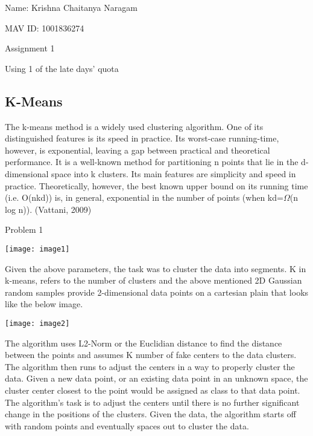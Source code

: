 \documentclass{article} %
\begin{document}


\noindent Name: Krishna Chaitanya Naragam

\noindent MAV ID: 1001836274

\noindent Assignment 1

\noindent Using 1 of the late days' quota

\noindent 
\subsection{K-Means}

\noindent The k-means method is a widely used clustering algorithm. One of its distinguished features is its speed in practice. Its worst-case running-time, however, is exponential, leaving a gap between practical and theoretical performance. It is a well-known method for partitioning n points that lie in the d-dimensional space into k clusters. Its main features are simplicity and speed in practice. Theoretically, however, the best known upper bound on its running time (i.e. O(nkd)) is, in general, exponential in the number of points (when kd=$\Omega$(n log n)). (Vattani, 2009)

\noindent 

\noindent Problem 1

\noindent \texttt{[image: image1]}

\noindent Given the above parameters, the task was to cluster the data into segments. K in k-means, refers to the number of clusters and the above mentioned 2D Gaussian random samples provide 2-dimensional data points on a cartesian plain that looks like the below image.

\noindent \texttt{[image: image2]}

\noindent The algorithm uses L2-Norm or the Euclidian distance to find the distance between the points and assumes K number of fake centers to the data clusters. The algorithm then runs to adjust the centers in a way to properly cluster the data. Given a new data point, or an existing data point in an unknown space, the cluster center closest to the point would be assigned as class to that data point. The algorithm's task is to adjust the centers until there is no further significant change in the positions of the clusters. Given the data, the algorithm starts off with random points and eventually spaces out to cluster the data. 
\end{document}
